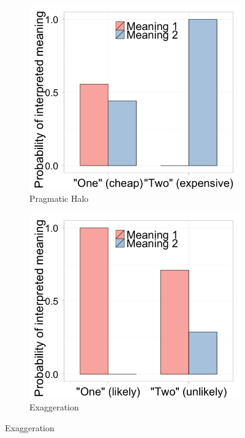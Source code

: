 \documentclass{article} %
\begin{document}
\begin{figure}[t]
        \begin{subfigure}[t]{0.33\textwidth}
                \centering
                \caption{Pragmatic Halo}
		\includegraphics[width=\textwidth]{model_halo.png}
		
	\end{subfigure}
        \begin{subfigure}[t]{0.33\textwidth}
                \centering
                \caption{Exaggeration}
                \includegraphics[width=\textwidth]{model_exagg.png}
		

\end{subfigure}
\end{figure}
\end{document}
